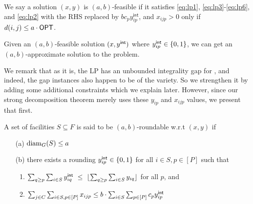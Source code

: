 \noindent		
We say a solution $(x,y)$ is $(a,b)$-feasible if it satisfies \eqref{eq:lp1}, \eqref{eq:lp3}-\eqref{eq:lp6}, and \eqref{eq:lp2} with the RHS replaced by $bc_py^\mathsf{int}_{ip}$, and $x_{ijp} > 0$ only if $d(i,j) \leq a\cdot \opt$.
\begin{claim}
Given an $(a,b)$-feasible solution $(x,\y)$ where $y^{{\mathsf{int}}}_{ip}\in \{0,1\}$,
we can get  an $(a,b)$-approximate solution to the \mckc problem.
\end{claim}
\iffalse
\begin{proof}
Consider a bipartite graph with client nodes $C$ on one side, and nodes of the form $(i,p)$ with $\y_{ip} = 1$ on the other. The node $(i,p)$ has capacity $bc_p$.
Since $(x,\y)$ satisfies the conditions of the lemma, there is a fractional matching in this graph so that each client $j$  is fractionally matched to an $(i,p)$ so that $d(i,j)\leq a\cdot \opt$,
and the total fractional load on $(i,p)$ is $\leq bc_p$. The theory of matching tells us that there is an {\em integral} assignment of clients $j$ to nodes $(i,p)$ such that $d(i,j)\leq a\cdot\opt$
and the number of nodes matched to $(i,p)$ is $\leq \ceil{bc_p}$. Therefore opening a capacity $c_p$ facility at $i$ for all $(i,p)$ with $\y_{ip} = 1$ gives an $(a,b)$-approximate solution to \mckc.
\end{proof}
\fi

We remark that as it is, the LP has an unbounded integrality gap for \mckc, and indeed, the gap instances also happen to be of the \cckp variety. So we strengthen it by adding some additional constraints which we explain later. However, since our strong decomposition theorem merely uses these $y_{ip}$ and $x_{ijp}$ values, we present that first. %
\begin{definition}\label{def:rnding-mkc}
	A set of facilities $S\subseteq F$ is said to be $(a,b)$-roundable w.r.t $(x,y)$ if
	\begin{itemize}[noitemsep]
		\item[(a)] $\mathrm{diam}_G(S) \leq a$
		\item[(b)] there exists a rounding $y^{{\mathsf{int}}}_{ip} \in \{0,1\}$ for all $i \in S, p\in [P]$ such that
		\begin{enumerate}
			\item $\sum_{q \geq p} \sum_{i\in S} y^{{\mathsf{int}}}_{iq} ~\leq~ \lfloor\sum_{q \geq p}\sum_{i\in S} y_{iq}\rfloor$ for all $p$, and
			\item $\sum_{j\in C}  \sum_{i\in S,p\in [P]} x_{ijp} \leq b\cdot \sum_{i\in S} \sum_{p\in [P]} c_p y^{{\mathsf{int}}}_{ip}$
		\end{enumerate}
	\end{itemize}
\end{definition}
\noindent

